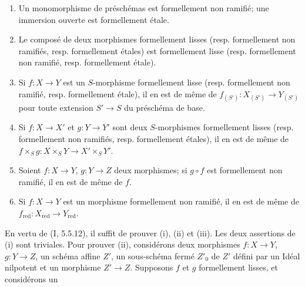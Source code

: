 \begin{proposition}[17.1.3]
\label{IV.17.1.3}
\begin{enumerate}
  \item[(i)] Un monomorphisme de préschémas est formellement non ramifié; une immersion ouverte est formellement étale.
  \item[(ii)] Le composé de deux morphismes formellement lisses (resp. formellement non ramifiés, resp. formellement étales) est formellement lisse (resp. formellement non ramifié, resp. formellement étale).
  \item[(iii)] Si $f:X\to Y$ est un $S$-morphisme formellement lisse (resp. formellement non ramifié, resp. formellement étale), il en est de même de $f_{(S')}:X_{(S')}\to Y_{(S')}$ pour toute extension $S'\to S$ du préschéma de base.
  \item[(iv)] Si $f:X\to X'$ et $g:Y\to Y'$ sont deux $S$-morphismes formellement lisses (resp. formellement non ramifiés, resp. formellement étales), il en est de même de $f\times_S g:X\times_S Y\to X'\times_S Y'$.
  \item[(v)] Soient $f:X\to Y$, $g:Y\to Z$ deux morphismes; si $g\circ f$ est formellement non ramifié, il en est de même de $f$.
  \item[(vi)] Si $f:X\to Y$ est un morphisme formellement non ramifié, il en est de même de $f_{\mathrm{red}}:X_{\mathrm{red}}\to Y_{\mathrm{red}}$.
\end{enumerate}
\end{proposition}

En vertu de (I, 5.5.12), il suffit de prouver (i), (ii) et (iii). Les deux assertions de (i) sont triviales. Pour prouver (ii), considérons deux morphismes $f:X\to Y$, $g:Y\to Z$, un schéma affine $Z'$, un sous-schéma fermé $Z'_0$ de $Z'$ défini par un Idéal nilpotent et un morphisme $Z'\to Z$. Supposons $f$ et $g$ formellement lisses, et considérons un
